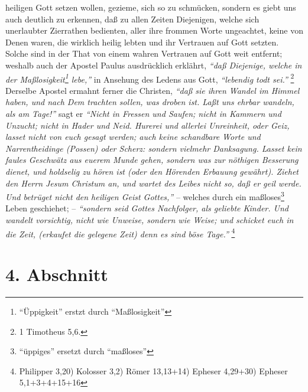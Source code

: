 heiligen Gott setzen wollen, gezieme, sich so zu schmücken, sondern es giebt uns
auch deutlich zu erkennen, daß zu allen Zeiten Diejenigen, welche sich
unerlaubter Zierrathen bedienten, aller ihre frommen Worte ungeachtet, keine von
Denen waren, die wirklich heilig lebten und ihr Vertrauen auf Gott setzten.
Solche sind in der That von einem wahren Vertrauen auf Gott weit entfernt;
weshalb auch der Apostel Paulus ausdrücklich erklährt,
\textit{"`daß Diejenige, welche
in der Maßlosigkeit\footnote{"`Üppigkeit"' erstzt durch "`Maßlosigkeit"'} lebe,"'} in Ansehung des Ledens aus Gott,
\textit{"`lebendig todt sei."'}
\footnote{1 Timotheus 5,6.}
Derselbe Apostel ermahnt ferner die Christen,
\textit{"`daß sie ihren Wandel im Himmel haben, und nach Dem trachten sollen, was droben
ist. Laßt uns ehrbar wandeln, als am Tage!"'} sagt er
\textit{"`Nicht in Fressen und
Saufen; nicht in Kammern und Unzucht; nicht in Hader und Neid. Hurerei und
allerlei Unreinheit, oder Geiz, lasset nicht von euch gesagt werden; auch keine
schandbare Worte und Narrentheidinge (Possen) oder Scherz: sondern vielmehr
Danksagung. Lasset kein faules Geschwätz aus euerem Munde gehen, sondern was zur
nöthigen Besserung dienet, und holdselig zu hören ist (oder den Hörenden
Erbauung gewährt). Ziehet den Herrn Jesum Christum an, und wartet des Leibes
nicht so, daß er geil werde. Und betrüget nicht den heiligen Geist Gottes,"'} --
welches durch ein maßloses\footnote{"`üppiges"' ersetzt durch "`maßloses"'} Leben geschiehet; --
\textit{"`sondern seid Gottes Nachfolger,
als geliebte Kinder. Und wandelt vorsichtig, nicht wie Unweise, sondern wie
Weise; und schicket euch in die Zeit, (erkaufet die gelegene Zeit) denn es sind
böse Tage."'}
\footnote{Philipper 3,20)  Kolosser 3,2)  Römer 13,13+14) Epheser 4,29+30) Epheser 5,1+3+4+15+16}

\section{4. Abschnitt} \label{kap15_ab4}

